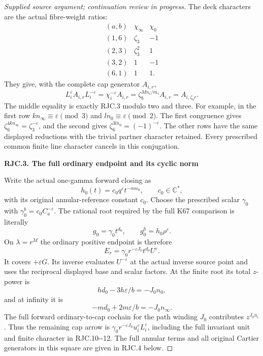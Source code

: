 \begin{proof}[Supplied source argument; continuation review in progress]
The deck characters are the actual fibre-weight ratios:
\[
\begin{array}{c|c|c}
(a,b)&\chi_\infty&\chi_0\\ \hline
(1,6)&\zeta_3&-1\\
(2,3)&\zeta_3^2&1\\
(3,2)&1&-1\\
(6,1)&1&1.
\end{array}                                                        \tag{RJC.11}
\]
They give, with the complete cap generator \(A_{i,r}\),
\[
 L_i^\varepsilon A_{i,r}L_i^{-\varepsilon}
 =\chi_i^{-\varepsilon}A_{i,r}
 =\zeta_b^{Mn_i/m_i}A_{i,r}
 =A_{i,\zeta_b r}.                                                  \tag{RJC.12}
\]
The middle equality is exactly RJC.3 modulo two and three. For example,
in the first row \(kn_\infty\equiv\varepsilon\pmod3\) and
\(ln_0\equiv\varepsilon\pmod2\). The first congruence gives
\(\zeta_6^{4kn_\infty}=\zeta_3^{-\varepsilon}\), and the second gives
\(\zeta_6^{3ln_0}=(-1)^{-\varepsilon}\). The other rows have the same
displayed reductions with the trivial partner character retained.
Every prescribed common finite line character cancels in this
conjugation.

\par

\medskip\noindent\textbf{RJC.3. The full ordinary endpoint and its cyclic norm}

\par\nobreak

Write the actual one-gamma forward closing as
\[
 h_0(t)=c_0 q^\varepsilon t^{-mn_0},\qquad c_0\in\mathbb C^*,          \tag{RJC.13}
\]
with its original annular-reference constant \(c_0\).
Choose the prescribed scalar \(\gamma_0\) with
\(\gamma_0^b=c_0C_a^{-\varepsilon}\).
The rational root required by the full K67 comparison is literally
\[
 g_0=\gamma_0t^{d_0},\qquad
 g_0^b=h_0\rho^\varepsilon.                                         \tag{RJC.14}
\]
On \(\lambda=r^M\) the ordinary positive endpoint is therefore
\[
 E_r=\gamma_0 r^{-\varepsilon J_0}t^{d_0}U^\varepsilon.               \tag{RJC.15}
\]
It covers \(+\varepsilon G\). Its inverse evaluates \(U^{-\varepsilon}\)
at the actual inverse source point and uses the reciprocal displayed
base and scalar factors. At the finite root its total \(z\)-power is
\[
 hd_0-3h\varepsilon/b=-J_0n_0,
\]
and at infinity it is
\[
 -md_0+2m\varepsilon/b=-J_0n_\infty.                                 \tag{RJC.16}
\]
The full forward ordinary-to-cap cochain for the path winding \(J_0\)
contributes \(z^{J_0n_i}\). Thus the remaining cap arrow is
\(\gamma_0 r^{-\varepsilon J_0}u_i^\varepsilon L_i^\varepsilon\),
including the full invariant unit and finite character in RJC.10-\/-12.
The full annular terms and all original Cartier generators in
this square are given in RJC.4 below.


\end{proof}
